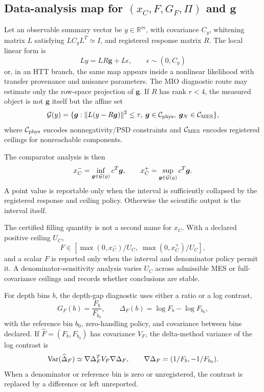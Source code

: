 \documentclass[11pt]{article}
\begin{document}
\subsection{Data-analysis map for \texorpdfstring{$(x_C,F,G_F,\Pi)$}{(xC,F,GF,Pi)} and \texorpdfstring{$\bm g$}{g}}
Let an observable summary vector be \(y\in\mathbb R^m\), with covariance \(C_y\), whitening matrix \(L\) satisfying \(LC_yL^T\simeq I\), and registered response matrix \(R\).  The local linear form is
\[
  Ly = LR\bm g + L\epsilon,
  \qquad \epsilon\sim(0,C_y)
\]
or, in an HTT branch, the same map appears inside a nonlinear likelihood with transfer provenance and nuisance parameters.  The MIO diagnostic route may estimate only the row-space projection of \(\bm g\).  If \(R\) has rank \(r<4\), the measured object is not \(\bm g\) itself but the affine set
\[
  {\cal G}(y)=\{\bm g: \|L(y-R\bm g)\|^2\le \tau,\; \bm g\in{\cal C}_{\rm phys},\; \bm g_N\in{\cal C}_{\rm MES}\},
\]
where \({\cal C}_{\rm phys}\) encodes nonnegativity/PSD constraints and \({\cal C}_{\rm MES}\) encodes registered ceilings for nonreachable components.

The comparator analysis is then
\[
  x_C^- = \inf_{\bm g\in{\cal G}(y)} c^T\bm g,
  \qquad
  x_C^+ = \sup_{\bm g\in{\cal G}(y)} c^T\bm g .
\]
A point value is reportable only when the interval is sufficiently collapsed by the registered response and ceiling policy.  Otherwise the scientific output is the interval itself.

The certified filling quantity is not a second name for \(x_C\).  With a declared positive ceiling \(U_C\),
\[
  F\in\left[\max(0,x_C^-)/U_C,\; \max(0,x_C^+)/U_C\right],
\]
and a scalar \(F\) is reported only when the interval and denominator policy permit it.  A denominator-sensitivity analysis varies \(U_C\) across admissible MES or full-covariance ceilings and records whether conclusions are stable.

For depth bins \(b\), the depth-gap diagnostic uses either a ratio or a log contrast,
\[
  G_F(b)=\frac{F_b}{F_{b_0}},
  \qquad
  \Delta_F(b)=\log F_b-\log F_{b_0},
\]
with the reference bin \(b_0\), zero-handling policy, and covariance between bins declared.  If \(\widehat F=(F_b,F_{b_0})
\) has covariance \(V_F\), the delta-method variance of the log contrast is
\[
  {\rm Var}(\widehat\Delta_F)
  \simeq
  \nabla \Delta_F^T V_F\nabla \Delta_F,
  \qquad
  \nabla\Delta_F=(1/F_b,-1/F_{b_0}).
\]
When a denominator or reference bin is zero or unregistered, the contrast is replaced by a difference or left unreported.
\end{document}
